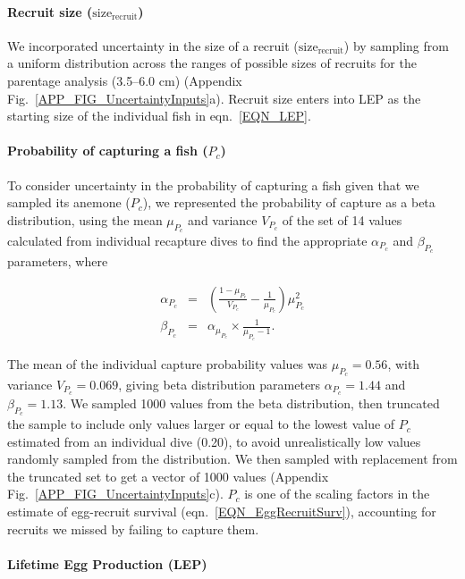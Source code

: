 \documentclass[12pt, oneside]{article}   	%
\begin{document}
\paragraph*{Recruit size ($\text{size}_\text{recruit}$)} 

We incorporated uncertainty in the size of a recruit ($\text{size}_\text{recruit}$) by sampling from a uniform distribution across the ranges of possible sizes of recruits for the parentage analysis (3.5--6.0 cm) (Appendix Fig.\ \ref{APP_FIG_UncertaintyInputs}a). Recruit size enters into LEP as the starting size of the individual fish in eqn.\ \ref{EQN_LEP}.

\paragraph*{Probability of capturing a fish ($P_c$)} 

To consider uncertainty in the probability of capturing a fish given that we sampled its anemone ($P_c$), we represented the probability of capture as a beta distribution, using the mean $\mu_{P_c}$ and variance $V_{P_c}$ of the set of 14 values calculated from individual recapture dives to find the appropriate $\alpha_{P_c}$ and $\beta_{P_c}$ parameters, where 

\begin{eqnarray}
\alpha_{P_c} &=& (\frac{1-\mu_{P_c}}{V_{P_c}} - \frac{1}{\mu_{P_c}}) \mu_{P_c}^2 \\
\beta_{P_c} &=& \alpha_{\mu_{P_c}} \times \frac{1}{\mu_{P_c} - 1}. \label{APP_EQN_ProbCapBetaDistParams}  
\end{eqnarray}

The mean of the individual capture probability values was $\mu_{P_c} = 0.56$, with variance $V_{P_c} = 0.069$, giving beta distribution parameters $\alpha_{P_c} = 1.44$ and $\beta_{P_c} = 1.13$. We sampled 1000 values from the beta distribution, then truncated the sample to include only values larger or equal to the lowest value of $P_c$ estimated from an individual dive (0.20), to avoid unrealistically low values randomly sampled from the distribution. We then sampled with replacement from the truncated set to get a vector of 1000 values (Appendix Fig.\ \ref{APP_FIG_UncertaintyInputs}c). $P_c$ is one of the scaling factors in the estimate of egg-recruit survival (eqn.\ \ref{EQN_EggRecruitSurv}), accounting for recruits we missed by failing to capture them.

\paragraph*{Lifetime Egg Production (LEP)} 
\end{document}
